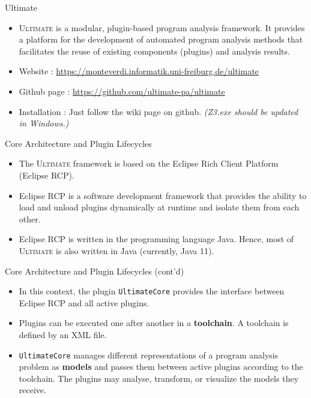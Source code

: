 \documentclass[12pt]{beamer}
\subtitle{(Based on [Daniel Dietsch : Automated verification of system requirements and software specifications. 2016.])}
\author{林宏陽}
\newcommand{\code}[1]{\texttt{#1}}
\newcommand{\Note}[1]{\textsl{\small(#1)}}
\newcommand{\ultimate}{\textsc{Ultimate }}
\newcommand{\ultimateURL}{\url{https://monteverdi.informatik.uni-freiburg.de/ultimate}}
\begin{document}
\begin{frame}
	\maketitle
\end{frame}

\begin{frame}{Ultimate}
  	\begin{itemize}
		\item \ultimate is a modular, plugin-based program analysis framework. It provides a platform for the development of automated program analysis methods that facilitates the reuse of existing components (plugins) and analysis results.
		\item Website : \ultimateURL
		\item Github page : \url{https://github.com/ultimate-pa/ultimate}
	  	\item Installation : Just follow the wiki page on github. \Note{Z3.exe should be updated in Windows.}
	\end{itemize}
\end{frame}

\begin{frame}{Core Architecture and Plugin Lifecycles}
  	\begin{itemize}
		\item The \ultimate framework is based on the Eclipse Rich Client Platform
	(Eclipse RCP).
		\item Eclipse RCP is a software development framework that provides  the ability to load and unload plugins dynamically at runtime and isolate them from each other.
		\item Eclipse RCP is written in the programming language Java.
		Hence, most of \ultimate is also written in Java (currently, Java 11).
  	\end{itemize}
\end{frame}

\begin{frame}{Core Architecture and Plugin Lifecycles (cont'd)}
	\begin{itemize}
	  	\item  In this context, the plugin \code{UltimateCore} provides the interface between Eclipse RCP and all active plugins.
	  	\item  Plugins can be executed one after another in a \textbf{toolchain}. A toolchain is defined by an XML file.
	  	\item \code{UltimateCore} manages different representations of a program analysis problem as \textbf{models} and passes them between active plugins according to the toolchain. The plugins may analyse, transform, or visualize the models they receive.
	\end{itemize}
\end{frame}
\end{document}
